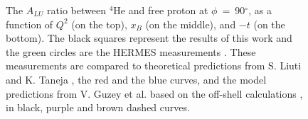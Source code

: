 \begin{figure}[tp]
\caption{The $A_{LU}$ ratio between $^4$He and free proton at 
   $\phi$~=~90$^{\circ}$, as a function of $Q^2$ (on the top), $x_B$ (on the 
   middle), and $-t$ (on the bottom). The black squares represent the results of 
   this work and the green circles are the HERMES measurements 
   \cite{HERMES_BSA}. These measurements are compared to theoretical 
   predictions from S. Liuti and K. Taneja \cite{simonetta_2}, the red and the 
blue curves, and the model predictions from V. Guzey et al. based on the 
off-shell calculations \cite{EMC_vadim_4}, in black, purple and brown dashed 
curves.}
\label{fig:coh_EMC_ratio_ALU}
\end{figure}

  
